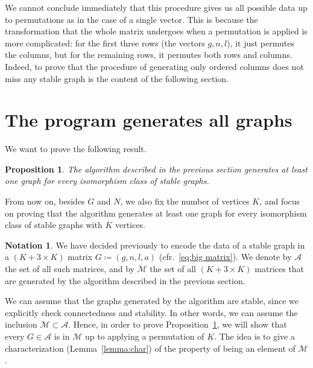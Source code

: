 \documentclass{amsart}
\theoremstyle{plain}
\newtheorem{proposition}[theorem]{Proposition}
\theoremstyle{definition}
\newtheorem{notation}[theorem]{Notation}
\newcommand{\ubar}[1]{\underline{#1}}
\begin{document}
We cannot conclude immediately that this procedure gives us all
possible data up to permutations as in the case of a single
vector. This is because the transformation that the whole matrix
undergoes when a permutation is applied is more complicated: for the
first three rows (the vectors $g,n,l$), it just permutes the columns,
but for the remaining rows, it permutes both rows and columns. Indeed,
to prove that the procedure of generating only ordered columns does
not miss any stable graph is the content of the following section.



\section{The program generates all graphs}\label{sec:proof}

We want to prove the following result.

\begin{proposition}\label{prop:main}
  The algorithm described in the previous section generates at least
  one graph for every isomorphism class of stable graphs.
\end{proposition}

From now on, besides $G$ and $N$, we also fix the number of vertices
$K$, and focus on proving that the algorithm generates at least one
graph for every isomorphism class of stable graphs with $K$ vertices.


\begin{notation}
  We have decided previously to encode the data of a stable graph in a
  $(K+3 \times K)$ matrix $G \coloneqq (g, n, l, a)$
  (cfr.~\eqref{eq:big matrix}). We denote by $\mathcal{A}$ the set of
  all such matrices, and by $\mathcal{M}$ the set of all $(K+3 \times
  K)$ matrices that are generated by the algorithm described in the
  previous section.
\end{notation}

We can assume that the graphs generated by the algorithm are stable,
since we explicitly check connectedness and stability. In other words,
we can assume the inclusion $\mathcal{M} \subset \mathcal{A}$. Hence,
in order to prove Proposition~\ref{prop:main}, we will show that every
$G \in \mathcal{A}$ is in $\mathcal{M}$ up to applying a permutation
of $\ubar{K}$. The idea is to give a characterization
(Lemma~\ref{lemma:char}) of the property of being an element of
$\mathcal{M}$.
\end{document}
